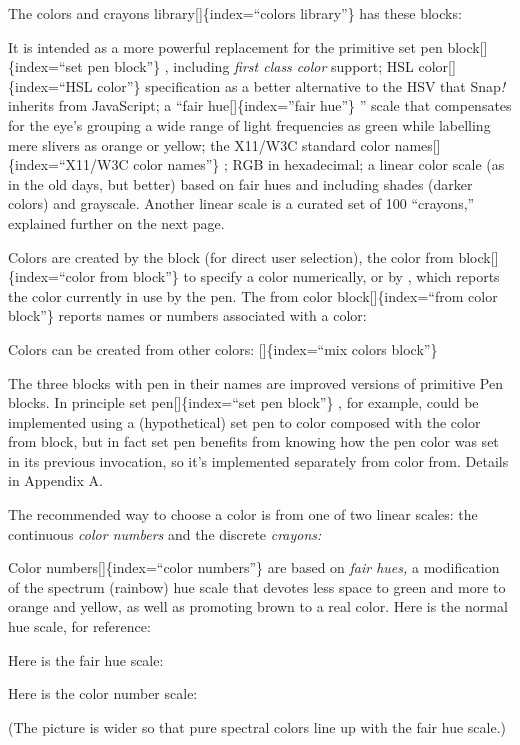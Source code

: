 \documentclass[
  letterpaper,
]{book}
\begin{document}
The colors and crayons library{[}{]}\{index=``colors library''\} has
these blocks:

It is intended as a more powerful replacement for the primitive set pen
block{[}{]}\{index=``set pen block''\} , including \emph{first class
color} support; HSL color{[}{]}\{index=``HSL color''\} specification as
a better alternative to the HSV that Snap\emph{!} inherits from
JavaScript; a ``fair hue{[}{]}\{index=''fair hue''\} '' scale that
compensates for the eye's grouping a wide range of light frequencies as
green while labelling mere slivers as orange or yellow; the X11/W3C
standard color names{[}{]}\{index=``X11/W3C color names''\} ; RGB in
hexadecimal; a linear color scale (as in the old days, but better) based
on fair hues and including shades (darker colors) and grayscale. Another
linear scale is a curated set of 100 ``crayons,'' explained further on
the next page.

Colors are created by the block (for direct user selection), the color
from block{[}{]}\{index=``color from block''\} to specify a color
numerically, or by , which reports the color currently in use by the
pen. The from color block{[}{]}\{index=``from color block''\} reports
names or numbers associated with a color:

Colors can be created from other colors: {[}{]}\{index=``mix colors
block''\}

The three blocks with pen in their names are improved versions of
primitive Pen blocks. In principle set pen{[}{]}\{index=``set pen
block''\} , for example, could be implemented using a (hypothetical) set
pen to color composed with the color from block, but in fact set pen
benefits from knowing how the pen color was set in its previous
invocation, so it's implemented separately from color from. Details in
Appendix A.

The recommended way to choose a color is from one of two linear scales:
the continuous \emph{color numbers} and the discrete \emph{crayons:}

Color numbers{[}{]}\{index=``color numbers''\} are based on \emph{fair
hues,} a modification of the spectrum (rainbow) hue scale that devotes
less space to green and more to orange and yellow, as well as promoting
brown to a real color. Here is the normal hue scale, for reference:

Here is the fair hue scale:

Here is the color number scale:

(The picture is wider so that pure spectral colors line up with the fair
hue scale.)
\end{document}
